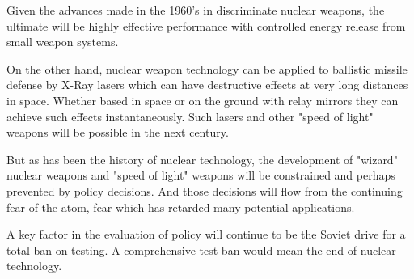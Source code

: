 Given the advances made in the 1960's in discriminate nuclear weapons, the ultimate will be highly effective performance with controlled energy release from small weapon systems.

On the other hand, nuclear weapon technology can be applied to ballistic missile defense by X-Ray lasers which can have destructive effects at very long distances in space. Whether based in space or on the ground with relay mirrors they can achieve such effects instantaneously. Such lasers and other "speed of light" weapons will be possible in the next century.

But as has been the history of nuclear technology, the development of "wizard" nuclear weapons and "speed of light" weapons will be constrained and perhaps prevented by policy decisions. And those decisions will flow from the continuing fear of the atom, fear which has retarded many potential applications.

A key factor in the evaluation of policy will continue to be the Soviet drive for a total ban on testing. A comprehensive test ban would mean the end of nuclear technology.
